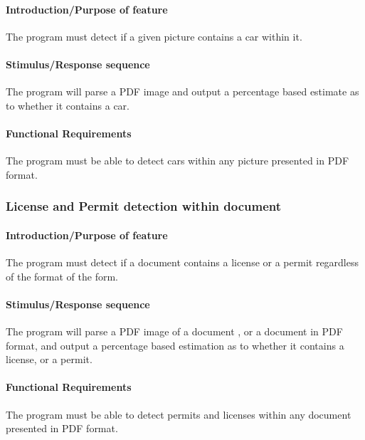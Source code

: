\documentclass[onecolumn, draftclsnofoot,10pt, compsoc]{IEEEtran}
\begin{document}
\hfill\begin{minipage}{\dimexpr\textwidth-1cm}
\paragraph{Introduction/Purpose of feature}
The program must detect if a given picture contains a car within it.
\paragraph{Stimulus/Response sequence}
The program will parse a PDF image and output a percentage based estimate as to whether it contains a car.
\paragraph{Functional Requirements}
The program must be able to detect cars within any picture presented in PDF format.
\end{minipage}
\vspace{.75cm}

\subsubsection{License and Permit detection within document}\vspace{.5cm}

\hfill\begin{minipage}{\dimexpr\textwidth-1cm}
\paragraph{Introduction/Purpose of feature}
The program must detect if a document contains a license or a permit regardless of the format of the form.
\paragraph{Stimulus/Response sequence}
The program will parse a PDF image of a document , or a document in PDF format, and output a percentage based estimation as to whether it contains a license, or a permit.
\paragraph{Functional Requirements}
The program must be able to detect permits and licenses within any document presented in PDF format.
\end{minipage}
\vspace{.75cm}
\end{document}
